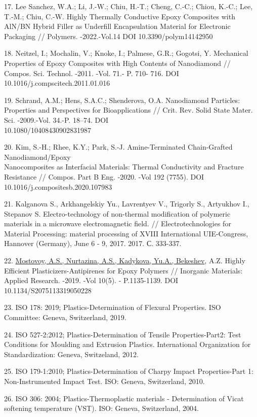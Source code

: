 \begin{references}
17. Lee Sanchez, W.A.; Li, J.-W.; Chiu, H.-T.; Cheng, C.-C.; Chiou, K.-C.;
Lee, T.-M.; Chiu, C.-W. Highly Thermally Conductive Epoxy Composites
with AlN/BN Hybrid Filler as Underfill Encapsulation Material for
Electronic Packaging // Polymers. -2022.-Vol.14 DOI 10.3390/polym14142950

18. Neitzel, I.; Mochalin, V.; Knoke, I.; Palmese, G.R.; Gogotsi, Y.
Mechanical Properties of Epoxy Composites with High Contents of
Nanodiamond // Compos. Sci. Technol. -2011. -Vol. 71.- P. 710- 716.
DOI 10.1016/j.compscitech.2011.01.016

19. Schrand, A.M.; Hens, S.A.C.; Shenderova, O.A. Nanodiamond Particles:
Properties and Perspectives for Bioapplications // Crit. Rev. Solid
State Mater. Sci. -2009.-Vol. 34.-P. 18--74. DOI
\\10.1080/10408430902831987

20. Kim, S.-H.; Rhee, K.Y.; Park, S.-J. Amine-Terminated Chain-Grafted
Nanodiamond/Epoxy \\Nanocomposites as Interfacial Materials: Thermal
Conductivity and Fracture Resistance // Compos. Part B Eng. -2020.
-Vol 192 (7755). DOI 10.1016/j.compositesb.2020.107983

21. Kalganova S., Arkhangelskiy Yu., Lavrentyev V., Trigorly S., Artyukhov
I., Stepanov S. Electro-technology of non-thermal modification of
polymeric materials in a microwave electromagnetic field. //
Electrotechnologies for Material Processing: material processing of
XVIII International UIE-Congress, Hannover (Germany), June 6 - 9,
2017. 2017. С. 333-337.

22. \href{https://www.en.j-pm.ru/kopiya-2019-1-articles1-7}{Mostovoy,
A.S., Nurtazina, A.S., Kadykova, Yu.A., Bekeshev}, A.Z. Highly
Efficient Plasticizers-Antipirenes for Epoxy Polymers // Inorganic
Materials: Applied Research. -2019. -Vol 10(5). - P.1135-1139. DOI
10.1134/S2075113319050228

23. ISO 178: 2019; Plastics-Determination of Flexural Properties. ISO
Committee: Geneva, Switzerland, 2019.

24. ISO 527-2:2012; Plastics-Determination of Tensile Properties-Part2:
Test Conditions for Moulding and Extrusion Plastics. International
Organization for Standardization: Geneva, Switzeland, 2012.

25. ISO 179-1:2010; Plastics-Determination of Charpy Impact
Properties-Part 1: Non-Instrumented Impact Test. ISO: Geneva,
Switzerland, 2010.

26. ISO 306: 2004; Plastics-Thermoplastic materials - Determination of
Vicat softening temperature (VST). ISO: Geneva, Switzerland, 2004.


\end{references}
